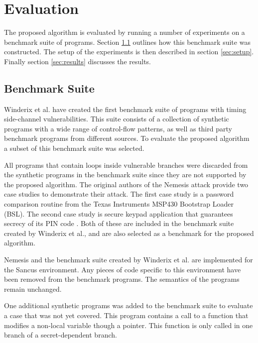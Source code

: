 
\chapter{Evaluation}
\label{cha:evaluation}
The proposed algorithm is evaluated by running a number of experiments on a benchmark suite of programs. 
Section \ref{sec:benchmark-suite} outlines how this benchmark suite was constructed. 
The setup of the experiments is then described in section \ref{sec:setup}. Finally section \ref{sec:results} discusses the results. 

\section{Benchmark Suite}
\label{sec:benchmark-suite}
Winderix et al. \cite{WinderixHans} have created the first benchmark suite of programs with timing side-channel vulnerabilities. This suite consists of a 
collection of synthetic programs with a wide range of control-flow patterns, as well as third party benchmark programs from different sources. 
To evaluate the proposed algorithm a subset of this benchmark suite was selected. 

All programs that contain loops inside vulnerable branches were discarded from the synthetic programs in the benchmark suite
since they are not supported by the proposed algorithm. 
The original authors of the Nemesis attack provide two case studies to demonstrate their attack. 
The first case study is a password comparison routine from the Texas Instruments MSP430 Bootstrap Loader (BSL). 
The second case study is secure keypad application that guarantees secrecy of its PIN code \cite{Nemesis}.
Both of these are included in the benchmark suite created by Winderix et al.\cite{WinderixHans}, and are also selected as a benchmark for the proposed algorithm. 

Nemesis and the benchmark suite created by Winderix et al. \cite{WinderixHans} are implemented for the Sancus environment. Any pieces of code specific to this
environment have been removed from the benchmark programs. The semantics of the programs remain unchanged. 

One additional synthetic programs was added to the benchmark suite to evaluate a case that was not yet covered. This program contains a call to a function that 
modifies a non-local variable though a pointer. This function is only called in one branch of a secret-dependent branch. 

